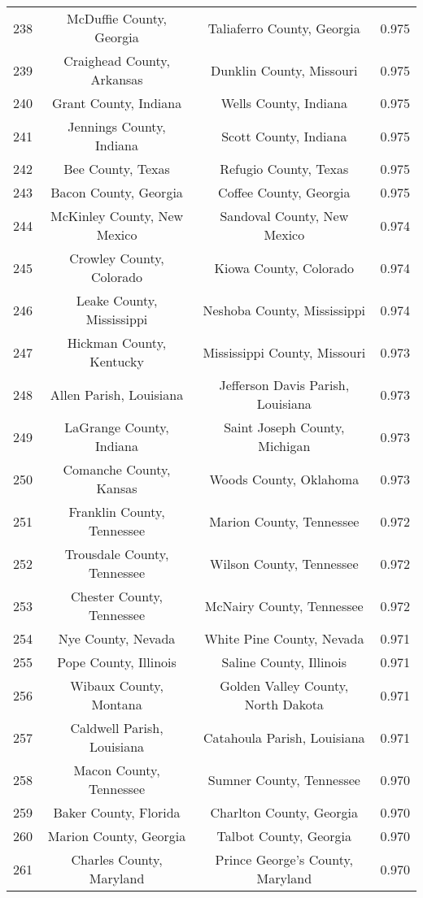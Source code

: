 \begin{longtable}{cccc}
  238 & McDuffie County, Georgia & Taliaferro County, Georgia & 0.975 \\ 
  239 & Craighead County, Arkansas & Dunklin County, Missouri & 0.975 \\ 
  240 & Grant County, Indiana & Wells County, Indiana & 0.975 \\ 
  241 & Jennings County, Indiana & Scott County, Indiana & 0.975 \\ 
  242 & Bee County, Texas & Refugio County, Texas & 0.975 \\ 
  243 & Bacon County, Georgia & Coffee County, Georgia & 0.975 \\ 
  244 & McKinley County, New Mexico & Sandoval County, New Mexico & 0.974 \\ 
  245 & Crowley County, Colorado & Kiowa County, Colorado & 0.974 \\ 
  246 & Leake County, Mississippi & Neshoba County, Mississippi & 0.974 \\ 
  247 & Hickman County, Kentucky & Mississippi County, Missouri & 0.973 \\ 
  248 & Allen Parish, Louisiana & Jefferson Davis Parish, Louisiana & 0.973 \\ 
  249 & LaGrange County, Indiana & Saint Joseph County, Michigan & 0.973 \\ 
  250 & Comanche County, Kansas & Woods County, Oklahoma & 0.973 \\ 
  251 & Franklin County, Tennessee & Marion County, Tennessee & 0.972 \\ 
  252 & Trousdale County, Tennessee & Wilson County, Tennessee & 0.972 \\ 
  253 & Chester County, Tennessee & McNairy County, Tennessee & 0.972 \\ 
  254 & Nye County, Nevada & White Pine County, Nevada & 0.971 \\ 
  255 & Pope County, Illinois & Saline County, Illinois & 0.971 \\ 
  256 & Wibaux County, Montana & Golden Valley County, North Dakota & 0.971 \\ 
  257 & Caldwell Parish, Louisiana & Catahoula Parish, Louisiana & 0.971 \\ 
  258 & Macon County, Tennessee & Sumner County, Tennessee & 0.970 \\ 
  259 & Baker County, Florida & Charlton County, Georgia & 0.970 \\ 
  260 & Marion County, Georgia & Talbot County, Georgia & 0.970 \\ 
  261 & Charles County, Maryland & Prince George's County, Maryland & 0.970 \\ 

\end{longtable}
